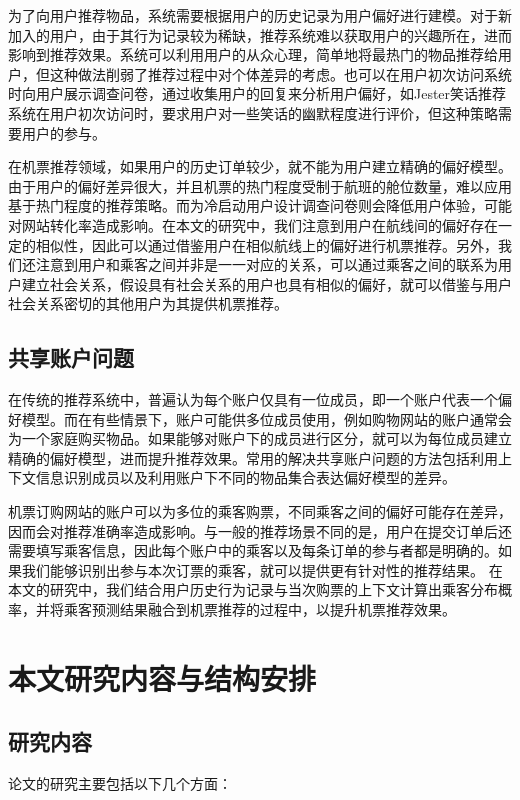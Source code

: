 为了向用户推荐物品，系统需要根据用户的历史记录为用户偏好进行建模。对于新加入的用户，由于其行为记录较为稀缺，推荐系统难以获取用户的兴趣所在，进而影响到推荐效果。系统可以利用用户的从众心理，简单地将最热门\cite{sun2012survey}的物品推荐给用户，但这种做法削弱了推荐过程中对个体差异的考虑。也可以在用户初次访问系统时向用户展示调查问卷，通过收集用户的回复来分析用户偏好，如Jester\cite{goldberg2001eigentaste}笑话推荐系统在用户初次访问时，要求用户对一些笑话的幽默程度进行评价，但这种策略需要用户的参与。

在机票推荐领域，如果用户的历史订单较少，就不能为用户建立精确的偏好模型。由于用户的偏好差异很大，并且机票的热门程度受制于航班的舱位数量，难以应用基于热门程度的推荐策略。而为冷启动用户设计调查问卷则会降低用户体验，可能对网站转化率造成影响。在本文的研究中，我们注意到用户在航线间的偏好存在一定的相似性，因此可以通过借鉴用户在相似航线上的偏好进行机票推荐。另外，我们还注意到用户和乘客之间并非是一一对应的关系，可以通过乘客之间的联系为用户建立社会关系\cite{sedhain2014social}，假设具有社会关系的用户也具有相似的偏好，就可以借鉴与用户社会关系密切的其他用户为其提供机票推荐。

\subsection{共享账户问题}

在传统的推荐系统中，普遍认为每个账户仅具有一位成员，即一个账户代表一个偏好模型\cite{kabutoya2010modeling}。而在有些情景下，账户可能供多位成员使用，例如购物网站的账户通常会为一个家庭购买物品。如果能够对账户下的成员进行区分，就可以为每位成员建立精确的偏好模型，进而提升推荐效果。常用的解决共享账户问题的方法包括利用上下文信息识别成员\cite{adomavicius2011context}以及利用账户下不同的物品集合\cite{verstrepen2015top}表达偏好模型的差异。

机票订购网站的账户可以为多位的乘客购票，不同乘客之间的偏好可能存在差异，因而会对推荐准确率造成影响。与一般的推荐场景不同的是，用户在提交订单后还需要填写乘客信息，因此每个账户中的乘客以及每条订单的参与者都是明确的。如果我们能够识别出参与本次订票的乘客，就可以提供更有针对性的推荐结果。
在本文的研究中，我们结合用户历史行为记录与当次购票的上下文计算出乘客分布概率，并将乘客预测结果融合到机票推荐的过程中，以提升机票推荐效果。


\section{本文研究内容与结构安排}
\subsection{研究内容}
论文的研究主要包括以下几个方面：

